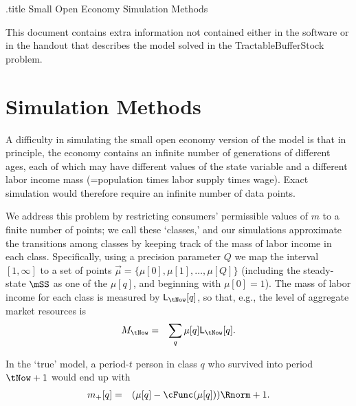 \documentclass{handout}
\begin{document}
\handoutHeader

\begin{verbatimwrite}{\jobname.title}
Small Open Economy Simulation Methods
\end{verbatimwrite}

\handoutNameMake

\newcommand{\Classes}{Q}
\newcommand{\class}{q}
\newcommand{\mclass}{\mu}
\newcommand{\mqNext}{m_{+}}
\newcommand{\uKoppa}{\underline{\koppa}}
\newcommand{\StakeClass}{\koppa}
\newcommand{\Stake}{S}
\newcommand{\LMass}{\mathsf{L}}
\newcommand{\lmass}{\ensuremath{\mathcal{L}}}

This document contains extra information not contained either in the software or in the handout 
that describes the model solved in the TractableBufferStock problem. 

\section{Simulation Methods}

A difficulty in simulating the small open economy version of the model is
that in principle, the economy contains an infinite number of
generations of different ages, each of which may have 
different values of the state variable and a different labor income
mass (=population times labor supply times wage).  Exact simulation
would therefore require an infinite number of data points.

We address this problem by restricting consumers' permissible values
of $m$ to a finite number of points; we call these `classes,' and our
simulations approximate the transitions among classes by keeping track
of the mass of labor income in each class.  Specifically, using a
precision parameter $\Classes$ we map the interval $[1,\infty]$ to a
set of points $\vec{\mclass} = \{\mclass[0],\mclass[1],\ldots,\mclass[\Classes]\}$
(including the steady-state $\mSS$ as one of the $\mclass[\class]$, and beginning
with $\mclass[0]=1$).  The mass of labor income for each
class is measured by
$\LMass_{\tNow}[\class]$, so that, e.g., the level of aggregate
market resources is
\begin{eqnarray}
  {M}_{\tNow} & = & \sum_{\class} \mclass[\class] \LMass_{\tNow}[\class]
.
\end{eqnarray}

In the `true' model, a period-$t$ person in class $\class$ who survived into period $\tNow+1$ 
would end up with
\begin{eqnarray}
  \mqNext[\class] & = & (\mclass[\class]-\cFunc(\mclass[\class]))\Rnorm + 1
.
\end{eqnarray}
\end{document}
